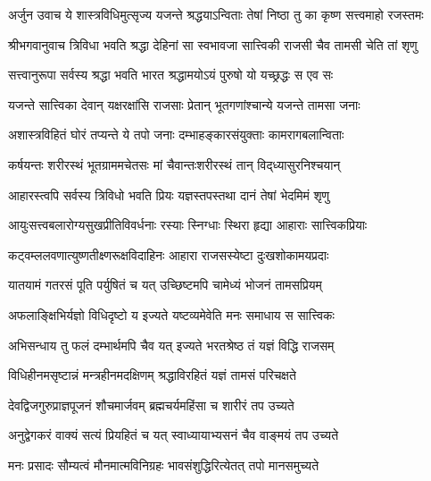 {अर्जुन उवाच}
\twolineshloka
{ये शास्त्रविधिमुत्सृज्य यजन्ते श्रद्धयाऽन्विताः}
{तेषां निष्ठा तु का कृष्ण सत्त्वमाहो रजस्तमः}%

\begin{minipage}{\linewidth}
\centering
{श्रीभगवानुवाच}
\twolineshloka
{त्रिविधा भवति श्रद्धा देहिनां सा स्वभावजा}
{सात्त्विकी राजसी चैव तामसी चेति तां शृणु}%
\end{minipage}

\twolineshloka
{सत्त्वानुरूपा सर्वस्य श्रद्धा भवति भारत}
{श्रद्धामयोऽयं पुरुषो यो यच्छ्रद्धः स एव सः}%

\twolineshloka
{यजन्ते सात्त्विका देवान् यक्षरक्षांसि राजसाः}
{प्रेतान् भूतगणांश्चान्ये यजन्ते तामसा जनाः}%

\twolineshloka
{अशास्त्रविहितं घोरं तप्यन्ते ये तपो जनाः}
{दम्भाहङ्कारसंयुक्ताः कामरागबलान्विताः}%

\twolineshloka
{कर्षयन्तः शरीरस्थं भूतग्राममचेतसः}
{मां चैवान्तःशरीरस्थं तान् विद्‌ध्यासुरनिश्चयान्}%

\twolineshloka
{आहारस्त्वपि सर्वस्य त्रिविधो भवति प्रियः}
{यज्ञस्तपस्तथा दानं तेषां भेदमिमं शृणु}%

\twolineshloka
{आयुःसत्त्वबलारोग्यसुखप्रीतिविवर्धनाः}
{रस्याः स्निग्धाः स्थिरा हृद्या आहाराः सात्त्विकप्रियाः}%

\twolineshloka
{कट्वम्ललवणात्युष्णतीक्ष्णरूक्षविदाहिनः}
{आहारा राजसस्येष्टा दुःखशोकामयप्रदाः}%

\twolineshloka
{यातयामं गतरसं पूति पर्युषितं च यत्}
{उच्छिष्टमपि चामेध्यं भोजनं तामसप्रियम्}%

\twolineshloka
{अफलाङ्क्षिभिर्यज्ञो विधिदृष्टो य इज्यते}
{यष्टव्यमेवेति मनः समाधाय स सात्त्विकः}%

\twolineshloka
{अभिसन्धाय तु फलं दम्भार्थमपि चैव यत्}
{इज्यते भरतश्रेष्ठ तं यज्ञं विद्धि राजसम्}%

\twolineshloka
{विधिहीनमसृष्टान्नं मन्त्रहीनमदक्षिणम्}
{श्रद्धाविरहितं यज्ञं तामसं परिचक्षते}%

\twolineshloka
{देवद्विजगुरुप्राज्ञपूजनं शौचमार्जवम्}
{ब्रह्मचर्यमहिंसा च शारीरं तप उच्यते}%

\twolineshloka
{अनुद्वेगकरं वाक्यं सत्यं प्रियहितं च यत्}
{स्वाध्यायाभ्यसनं चैव वाङ्मयं तप उच्यते}%

\twolineshloka
{मनः प्रसादः सौम्यत्वं मौनमात्मविनिग्रहः}
{भावसंशुद्धिरित्येतत् तपो मानसमुच्यते}%

